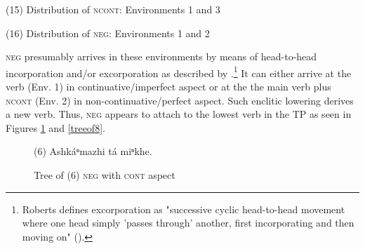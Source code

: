 \documentclass[output=paper]{LSP/langsci}
\begin{document}
\vspace{1em}
(15)	Distribution of \textsc{ncont}:	Environments 1 and 3

\vspace{1em}
(16)	Distribution of \textsc{neg}:	Environments 1 and 2

\vspace{1em}
\textsc{neg} presumably arrives in these environments by means of head-to-head incorporation and/or excorporation as described by \citet{Roberts1991}.\footnote{Roberts defines excorporation as "successive cyclic head-to-head movement where one head simply 'passes through' another, first incorporating and then moving on" (\citeyear[211]{Roberts1991}).} It can either arrive at the verb (Env. 1) in continuative/imperfect aspect or at the the main verb plus \textsc{ncont} (Env. 2) in non-continuative/perfect aspect. Such enclitic lowering derives a new verb. Thus, \textsc{neg} appears to attach to the lowest verb in the TP as seen in Figures \ref{treeof6} and \ref{treeof8}.

\begin{figure}
\caption{Tree of (6) \textsc{neg} with \textsc{cont} aspect} \label{treeof6}
\begin{center}
(6) Ashk\'aⁿmazhi t\'a miⁿkhe.

\end{center}
\end{figure}
\end{document}
